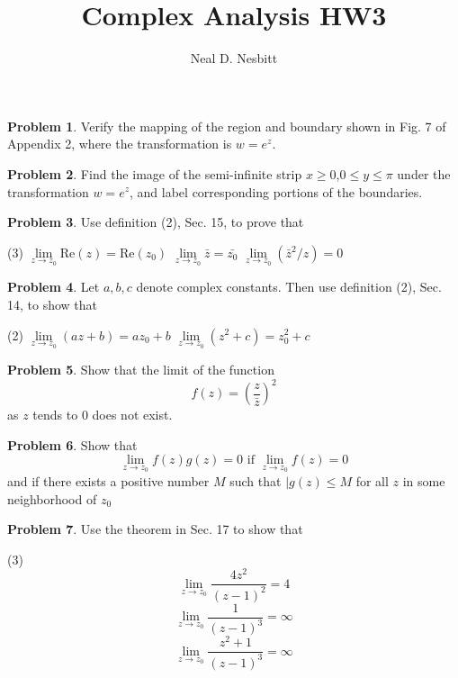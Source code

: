 \documentclass{article}
\title{Complex Analysis HW3\\}
\author{Neal D. Nesbitt}
\begin{document}
\maketitle

\theoremstyle{definition}
\newtheorem{problem}{Problem}
\newtheorem{solution}{Solution}[problem]
\renewcommand{\thesolution}{\theproblem}

\begin{problem}
Verify the mapping of the region and boundary shown in Fig. 7 of Appendix 2, where the transformation is $w=e^{z}$.
\end{problem}

\begin{problem}
Find the image of the semi-infinite strip $x\ge 0$,$0\le y \le \pi$ under the transformation $w=e^{z}$, and label corresponding portions of the boundaries.
\end{problem}

\begin{problem}
Use definition (2), Sec. 15, to prove that
\begin{tasks}(3)
\task $\lim\limits_{z\to z_{0}} \text{Re} (z) = \text{Re} (z_{0})$
\task $\lim\limits_{z\to z_{0}} \bar{z} = \bar{z_{0}}$
\task $\lim\limits_{z\to z_{0}} (\bar{z}^{2}/z) = 0$
\end{tasks}
\end{problem}

\begin{problem}
Let $a,b,c$ denote complex constants. Then use definition (2), Sec. 14, to show that
\begin{tasks}(2)
\task $\lim\limits_{z\to z_{0}} (az+b) = az_{0} + b$
\task $\lim\limits_{z\to z_{0}} (z^{2}+c) = z_{0}^{2} + c$
\end{tasks}
\end{problem}

\begin{problem}
Show that the limit of the function
\[ f(z) = \left(\frac{z}{\bar{z}}\right)^{2} \]
as $z$ tends to $0$ does not exist.
\end{problem}

\begin{problem}
Show that
\[ \lim\limits_{z\to z_{0}} f(z)g(z) = 0 \text{ if } \lim\limits_{z\to z_{0}} f(z) = 0 \]
and if there exists a positive number $M$ such that $|g(z)\le M$ for all $z$ in some neighborhood of $z_{0}$
\end{problem}

\begin{problem}
Use the theorem in Sec. 17 to show that
\begin{tasks}(3)
\task \[ \lim\limits_{z\to z_{0}} \frac{4z^{2}}{(z-1)^{2}} = 4\]
\task \[ \lim\limits_{z\to z_{0}} \frac{1}{(z-1)^{3}} = \infty \]
\task \[ \lim\limits_{z\to z_{0}} \frac{z^{2}+1}{(z-1)^{3}} = \infty \]
\end{tasks}
\end{problem}
\end{document}
